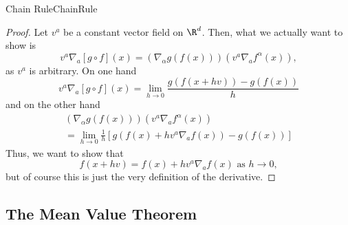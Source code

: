 \begin{prp}{Chain Rule}{ChainRule}
\begin{proof}
Let $v^a$ be a constant vector field on $\R ^d$.  Then, what we actually want to show is
\begin{equation}
v^a\nabla _a[g\circ f](x)=\left( \nabla _\alpha g(f(x))\right) \left( v^a\nabla _af^\alpha (x)\right) ,
\end{equation}
as $v^a$ is arbitrary.  On one hand
\begin{equation}\label{5.2.18}
v^a\nabla _a[g\circ f](x)=\lim _{h\to 0}\frac{g\left( f(x+hv)\right) -g(f(x))}{h}
\end{equation}
and on the other hand
\begin{equation}
\begin{multlined}
\left( \nabla _\alpha g(f(x))\right) \left( v^a\nabla _af^\alpha (x)\right) \\ =\lim _{h\to 0}\frac{1}{h}\left[ g\left( f(x)+hv^a\nabla _af(x)\right) -g(f(x))\right]
\end{multlined}
\end{equation}
Thus, we want to show that
\begin{equation}
f(x+hv)=f(x)+hv^a\nabla _af(x)\text{ as }h\to 0,
\end{equation}
but of course this is just the very definition of the derivative.
\end{proof}
\end{prp}

\subsection{The Mean Value Theorem}

